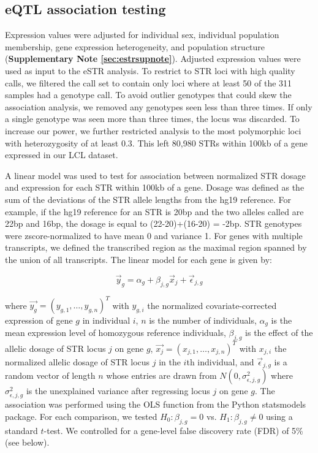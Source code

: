 \subsection{eQTL association testing}
Expression values were adjusted for individual sex, individual population membership, gene expression heterogeneity, and population structure (\textbf{Supplementary Note \ref{sec:estrsupnote}}). Adjusted expression values were used as input to the eSTR analysis. To restrict to STR loci with high quality calls, we filtered the call set to contain only loci where at least 50 of the 311 samples had a genotype call. To avoid outlier genotypes that could skew the association analysis, we removed any genotypes seen less than three times. If only a single genotype was seen more than three times, the locus was discarded. To increase our power, we further restricted analysis to the most polymorphic loci with heterozygosity of at least 0.3. This left 80,980 STRs within 100kb of a gene expressed in our LCL dataset.

A linear model was used to test for association between normalized STR dosage and expression for each STR within 100kb of a gene. Dosage was defined as the sum of the deviations of the STR allele lengths from the hg19 reference. For example, if the hg19 reference for an STR is 20bp and the two alleles called are 22bp and 16bp, the dosage is equal to (22-20)+(16-20) = -2bp. STR genotypes were zscore-normalized to have mean 0 and variance 1. For genes with multiple transcripts, we defined the transcribed region as the maximal region spanned by the union of all transcripts. The linear model for each gene is given by:

\begin{equation}
\vec{y}_g = \alpha_g + \beta_{j,g}\vec{x}_j + \vec{\epsilon}_{j,g}
\end{equation}

where $\vec{y_g} = (y_{g,1},\hdots, y_{g,n})^T$  with $y_{g,i}$ the normalized covariate-corrected expression of gene $g$ in individual $i$, $n$ is the number of individuals, $\alpha_g$ is the mean expression level of homozygous reference individuals, $\beta_{j,g}$ is the effect of the allelic dosage of STR locus $j$ on gene $g$, $\vec{x_j} = (x_{j,1}, \hdots, x_{j,n})^T$ with $x_{j,i}$ the normalized allelic dosage of STR locus $j$ in the $i$th individual, and $\vec{\epsilon}_{j,g}$ is a random vector of length $n$ whose entries are drawn from $N(0, \sigma_{\epsilon, j, g}^2)$ where $\sigma_{\epsilon, j, g}^2$ is the unexplained variance after regressing locus $j$ on gene $g$. The association was performed using the OLS function from the Python statsmodels package. For each comparison, we tested $H_0: \beta_{j,g} = 0$ vs. $H_1: \beta_{j,g} \neq 0$ using a standard $t$-test. We controlled for a gene-level false discovery rate (FDR) of 5\% (see below).

